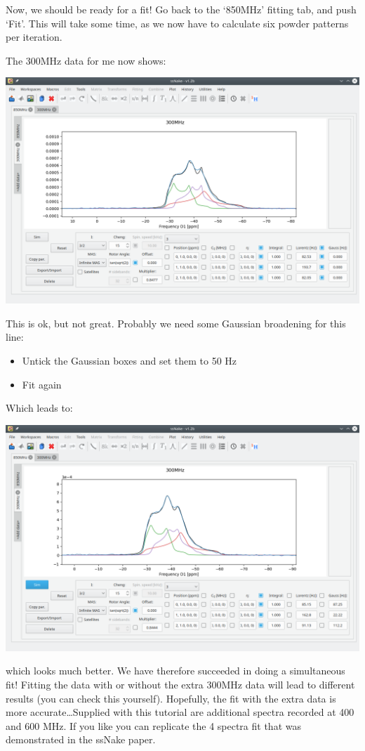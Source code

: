 \documentclass[11pt,a4paper]{article}
\begin{document}
Now, we should be ready for a fit! Go back to the `850MHz' fitting tab, and push `Fit'. This will
take some time, as we now have to calculate six powder patterns per iteration.

The 300MHz data for me now shows:
\begin{center}
\includegraphics[width=1.0\linewidth]{Figs/Fig13.png}
\end{center}
This is ok, but not great. Probably we need some Gaussian broadening for this line:
\begin{itemize}
  \item Untick the Gaussian boxes and set them to 50 Hz
  \item Fit again
\end{itemize}
Which leads to:
\begin{center}
\includegraphics[width=1.0\linewidth]{Figs/Fig14.png}
\end{center}
which looks much better. We have therefore succeeded in doing a simultaneous fit! Fitting the data
with or without the extra 300MHz data will lead to different results (you can check this yourself).
Hopefully, the fit with the extra data is more accurate\ldots Supplied with this tutorial are
additional spectra recorded at 400 and 600 MHz. If you like you can replicate the 4 spectra fit that
was demonstrated in the ssNake paper.
\end{document}
